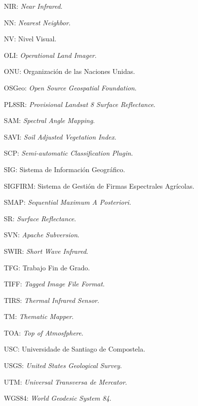NIR: \textit{Near Infrared}.

NN: \textit{Nearest Neighbor}.

NV: Nivel Visual.

OLI: \textit{Operational Land Imager}.

ONU: Organización de las Naciones Unidas.

OSGeo: \textit{Open Source Geospatial Foundation}.

PL8SR: \textit{Provisional Landsat 8 Surface Reflectance}.

SAM: \textit{Spectral Angle Mapping}.

SAVI: \textit{Soil Adjusted Vegetation Index}.

SCP: \textit{Semi-automatic Classification Plugin}.

SIG: Sistema de Información Geográfico.

SIGFIRM: Sistema de Gestión de Firmas Espectrales Agrícolas.

SMAP: \textit{Sequential Maximum A Posteriori}.

SR: \textit{Surface Reflectance}.

SVN: \textit{Apache Subversion}.

SWIR: \textit{Short Wave Infrared}.

TFG: Trabajo Fin de Grado.

TIFF: \textit{Tagged Image File Format}.

TIRS: \textit{Thermal Infrared Sensor}.

TM: \textit{Thematic Mapper}.

TOA: \textit{Top of Atmosfphere}.

USC: Universidade de Santiago de Compostela.

USGS: \textit{United States Geological Survey}.

UTM: \textit{Universal Transversa de Mercator}.

WGS84: \textit{World Geodesic System 84}.